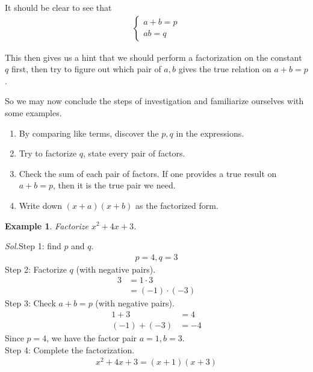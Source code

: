 \documentclass[12pt]{article}
\newtheorem{example}{Example}
\begin{document}
    It should be clear to see that \begin{align*}
        \begin{cases}
            a+b=p\\
            ab=q
        \end{cases}
    \end{align*}

    This then gives us a hint that we should perform a factorization on the constant $q$ first, then try to figure out which pair of $a,b$ gives the true relation on $a+b=p$.

    So we may now conclude the steps of investigation and familiarize ourselves with some examples.\begin{enumerate}
        \item By comparing like terms, discover the $p,q$ in the expressions.
        \item Try to factorize $q$, state every pair of factors.
        \item Check the sum of each pair of factors. If one provides a true result on $a+b=p$, then it is the true pair we need.
        \item Write down $(x+a)(x+b)$ as the factorized form.
    \end{enumerate}

    \begin{example}
        Factorize $x^2+4x+3$.
    \end{example}

    \textit{ Sol.}Step 1: find $p$ and $q$.
    \begin{align*}
        p=4, q=3
    \end{align*}
    \indent \indent Step 2: Factorize $q$ (with negative pairs).
    \begin{align*}
        3&=1\cdot 3\\
        &=(-1)\cdot(-3)
    \end{align*}
    \indent \indent Step 3: Check $a+b=p$ (with negative pairs).
    \begin{align*}
        1+3&=4\\
        (-1)+(-3)&=-4
    \end{align*}
    \indent \indent \indent Since $p=4$, we have the factor pair $a=1,b=3$.\\
    \indent \indent Step 4: Complete the factorization.
    \begin{align*}
        x^2+4x+3=(x+1)(x+3)
    \end{align*}
\end{document}
